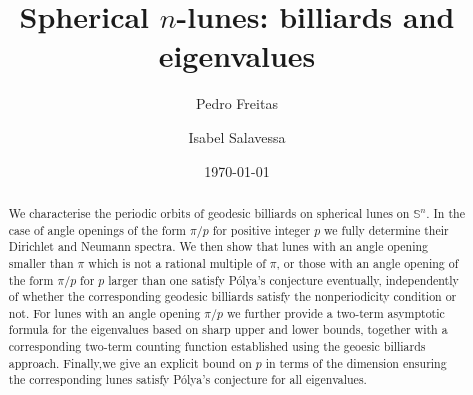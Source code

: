 \documentclass[11pt,a4paper,times]{amsart}
\theoremstyle{plain}
\theoremstyle{definition}
\numberwithin{equation}{section}
\newcommand{\Se}{\mathbb{S}}
\begin{document}
\title{Spherical  $n$-lunes: billiards and eigenvalues}

\author[P. Freitas]{Pedro Freitas}
\author[I. Salavessa]{Isabel Salavessa}
\address{Grupo de F\'{\i}sica Matem\'{a}tica, Instituto Superior T\'{e}cnico, Universidade de Lisboa, Av. Rovisco Pais, 1049-001 Lisboa, Portugal}
\address{Grupo de F\'{\i}sica Matem\'{a}tica, Instituto Superior T\'{e}cnico, Universidade de Lisboa, Av. Rovisco Pais, 1049-001 Lisboa, Portugal}

\date{\today}

\begin{abstract}
We characterise the periodic orbits of geodesic billiards on spherical lunes on $\Se^{n}$. In the case of angle openings
of the form $\pi/p$ for positive integer $p$ we fully determine their Dirichlet and Neumann spectra. We then show that
lunes with an angle opening smaller than $\pi$ which is not a rational multiple of $\pi$, or those with an angle opening
of the form $\pi/p$ for $p$ larger than one satisfy P\'{o}lya's conjecture eventually, independently of whether the
corresponding geodesic billiards satisfy the nonperiodicity condition or not. For lunes with an angle opening
$\pi/p$ we further provide a two-term asymptotic formula for the eigenvalues
based on sharp upper and lower bounds, together with a corresponding two-term counting function established using the
geoesic billiards approach. Finally,we give an explicit bound on $p$ in terms of the dimension ensuring the corresponding
lunes satisfy P\'{o}lya's conjecture for all eigenvalues.
\end{abstract}
\maketitle

\setcounter{tocdepth}{2}
  \tableofcontents
\end{document}
